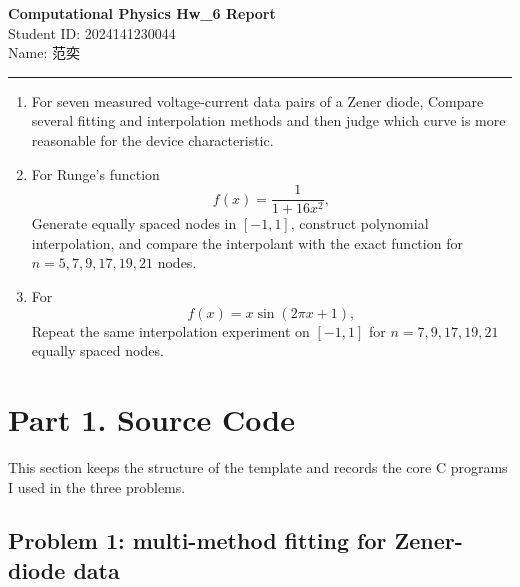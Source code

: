 \documentclass[12pt,a4paper]{article}
\newcommand{\HomeworkTitle}{Computational Physics Hw\_6 Report}
\newcommand{\StudentID}{2024141230044}
\newcommand{\StudentName}{范奕}
\begin{document}
\begin{center}
    {\LARGE \textbf{\HomeworkTitle}}\\[1.2em]
    {\large Student ID: \StudentID}\\[0.5em]
    {\large Name: \StudentName}
\end{center}

\vspace{1em}
\noindent\rule{\textwidth}{0.8pt}
\vspace{1.5em}


\begin{enumerate}[label=(\arabic*)]
    \item For seven measured voltage-current data pairs of a Zener diode, Compare several fitting and interpolation methods and then judge which curve is more reasonable for the device characteristic.
    \item For Runge's function
    \[
    f(x)=\frac{1}{1+16x^2},
    \]
    Generate equally spaced nodes in $[-1,1]$, construct polynomial interpolation, and compare the interpolant with the exact function for $n=5,7,9,17,19,21$ nodes.
    \item For
    \[
    f(x)=x\sin(2\pi x+1),
    \]
    Repeat the same interpolation experiment on $[-1,1]$ for $n=7,9,17,19,21$ equally spaced nodes.
\end{enumerate}

\newpage
\tableofcontents
\newpage

\section{Part 1. Source Code}

This section keeps the structure of the template and records the core C programs I used in the three problems.

\subsection{Problem 1: multi-method fitting for Zener-diode data}
\end{document}
